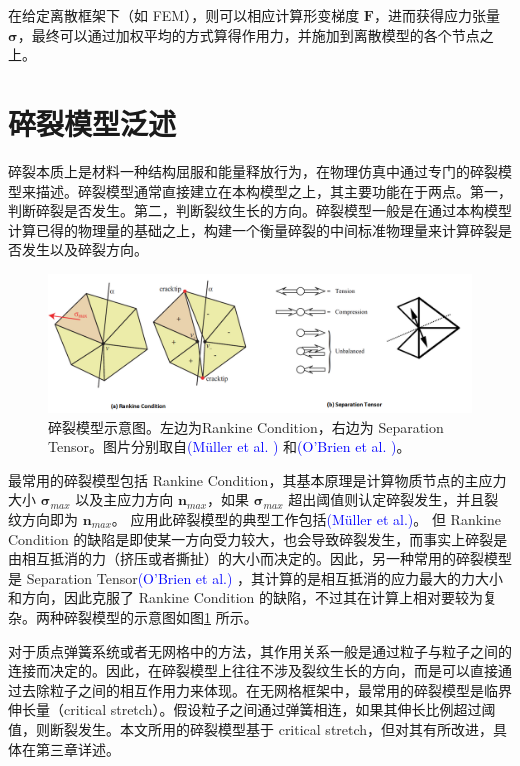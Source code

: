 在给定离散框架下（如 FEM），则可以相应计算形变梯度 $\textbf{F}$，进而获得应力张量 $\mathbf{\sigma}$，最终可以通过加权平均的方式算得作用力，并施加到离散模型的各个节点之上。

\section{碎裂模型泛述}
\label{fracture_model_section}

碎裂本质上是材料一种结构屈服和能量释放行为，在物理仿真中通过专门的碎裂模型来描述。碎裂模型通常直接建立在本构模型之上，其主要功能在于两点。第一，判断碎裂是否发生。第二，判断裂纹生长的方向。碎裂模型一般是在通过本构模型计算已得的物理量的基础之上，构建一个衡量碎裂的中间标准物理量来计算碎裂是否发生以及碎裂方向。

\begin{figure}[!htb]
  \centering
  \captionsetup{justification=centering}
  \includegraphics[width=\linewidth]{chap/image/fracture_model}

  \caption{\label{fracture_model}
           碎裂模型示意图。左边为Rankine Condition，右边为 Separation Tensor。图片分别取自\textcolor{blue}{(M\"{u}ller et al. )\parencite{Muller2004}} 和\textcolor{blue}{(O'Brien et al. )\parencite{OBrien1999}}。
          }
\end{figure}

最常用的碎裂模型包括 Rankine Condition，其基本原理是计算物质节点的主应力大小 $\mathbf{\sigma}_{max}$ 以及主应力方向 $\textbf{n}_{max}$，如果 $\mathbf{\sigma}_{max}$ 超出阈值则认定碎裂发生，并且裂纹方向即为 $\textbf{n}_{max}$。 应用此碎裂模型的典型工作包括\textcolor{blue}{(M\"{u}ller et al.)\parencite{Muller2004}}。 但 Rankine Condition 的缺陷是即使某一方向受力较大，也会导致碎裂发生，而事实上碎裂是由相互抵消的力（挤压或者撕扯）的大小而决定的。因此，另一种常用的碎裂模型是 Separation Tensor\textcolor{blue}{(O'Brien et al.)\parencite{OBrien1999}} ，其计算的是相互抵消的应力最大的力大小和方向，因此克服了 Rankine Condition 的缺陷，不过其在计算上相对要较为复杂。两种碎裂模型的示意图如图\ref{fracture_model} 所示。

对于质点弹簧系统或者无网格中的方法，其作用关系一般是通过粒子与粒子之间的连接而决定的。因此，在碎裂模型上往往不涉及裂纹生长的方向，而是可以直接通过去除粒子之间的相互作用力来体现。在无网格框架中，最常用的碎裂模型是临界伸长量（critical stretch）。假设粒子之间通过弹簧相连，如果其伸长比例超过阈值，则断裂发生。本文所用的碎裂模型基于 critical stretch，但对其有所改进，具体在第三章详述。

